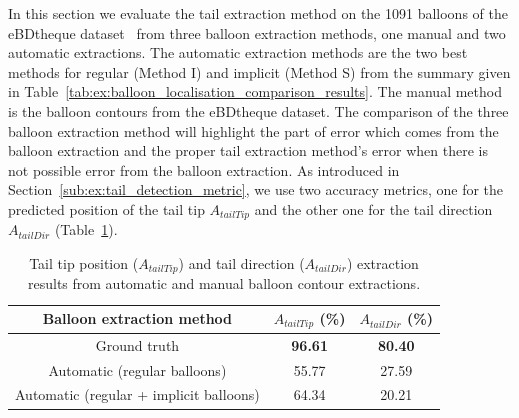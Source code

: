 In this section we evaluate the tail extraction method on the 1091 balloons of the eBDtheque dataset~\cite{Guerin2013} from three balloon extraction methods, one manual and two automatic extractions.
The automatic extraction methods are the two best methods for regular (Method I) and implicit (Method S) from the summary given in Table~\ref{tab:ex:balloon_localisation_comparison_results}.
The manual method is the balloon contours from the eBDtheque dataset.
The comparison of the three balloon extraction method will highlight the part of error which comes from the balloon extraction and the proper tail extraction method's error when there is not possible error from the balloon extraction.
As introduced in Section~\ref{sub:ex:tail_detection_metric}, we use two accuracy metrics, one for the predicted position of the tail tip $A_{tailTip}$ and the other one for the tail direction $A_{tailDir}$
 (Table~\ref{tab:ex:tail_evaluation}).




  \begin{table}[h]

    \centering
    \caption{Tail tip position ($A_{tailTip}$) and tail direction ($A_{tailDir}$) extraction results from automatic and manual balloon contour extractions.}
    \begin{tabular}{|c|c|c|}
          \hline
          Balloon extraction method&  $A_{tailTip}$ (\%)  & $A_{tailDir}$ (\%)    \\
          \hline
          Ground truth        & \textbf{96.61}    & \textbf{80.40}     \\
          \hline
          Automatic (regular balloons)    & 55.77    & 27.59     \\
          \hline
          Automatic (regular + implicit balloons)    & 64.34    & 20.21     \\
          \hline
        \end{tabular}
    \label{tab:ex:tail_evaluation}
  \end{table}%


